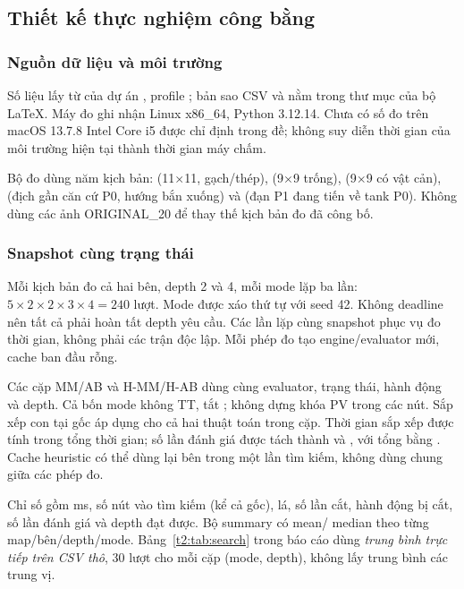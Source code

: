 \subsection{Thiết kế thực nghiệm công bằng}
\subsubsection{Nguồn dữ liệu và môi trường}
Số liệu lấy từ  của dự án \cite{project}, profile
; bản sao CSV và
 nằm trong thư mục  của bộ LaTeX.
Máy đo ghi nhận Linux x86\_64, Python 3.12.14. Chưa có số đo trên
macOS 13.7.8 Intel Core i5 được chỉ định trong đề; không suy diễn
thời gian của môi trường hiện tại thành thời gian máy chấm.

Bộ đo dùng năm kịch bản:  (11$\times$11, gạch/thép),
 (9$\times$9 trống),  (9$\times$9 có vật cản),
 (địch gần căn cứ P0, hướng bắn xuống) và 
(đạn P1 đang tiến về tank P0). Không dùng các ảnh ORIGINAL\_20 để
thay thế kịch bản đo đã công bố.

\subsubsection{Snapshot cùng trạng thái}
Mỗi kịch bản đo cả hai bên, depth 2 và 4, mỗi mode lặp ba lần:
$5\times2\times2\times3\times4=240$ lượt. Mode được xáo thứ tự với
seed 42. Không deadline nên tất cả phải hoàn tất depth yêu cầu.
Các lần lặp cùng snapshot phục vụ đo thời gian, không phải các trận
độc lập. Mỗi phép đo tạo engine/evaluator mới, cache ban đầu rỗng.

Các cặp MM/AB và H-MM/H-AB dùng cùng evaluator, trạng thái, hành động
và depth. Cả bốn mode không TT, tắt ; không dựng khóa
PV trong các nút. Sắp xếp con tại gốc áp dụng cho cả hai thuật toán
trong cặp. Thời gian sắp xếp được tính trong tổng thời gian; số lần
đánh giá được tách thành  và ,
với tổng bằng . Cache heuristic có thể dùng lại
bên trong một lần tìm kiếm, không dùng chung giữa các phép đo.

Chỉ số gồm ms, số nút vào tìm kiếm (kể cả gốc), lá, số lần cắt, hành
động bị cắt, số lần đánh giá và depth đạt được. Bộ summary có mean/
median theo từng map/bên/depth/mode. Bảng~\ref{t2:tab:search} trong
báo cáo dùng \emph{trung bình trực tiếp trên CSV thô}, 30 lượt cho
mỗi cặp (mode, depth), không lấy trung bình các trung vị.

